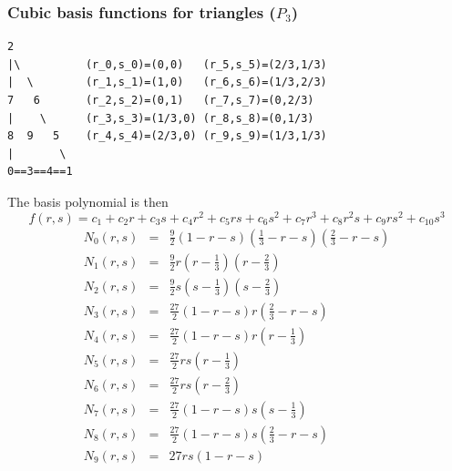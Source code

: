 









\subsubsection{Cubic basis functions for triangles ($P_3$)}

\begin{verbatim}
2
|\          (r_0,s_0)=(0,0)   (r_5,s_5)=(2/3,1/3)
|  \        (r_1,s_1)=(1,0)   (r_6,s_6)=(1/3,2/3)
7   6       (r_2,s_2)=(0,1)   (r_7,s_7)=(0,2/3)
|    \      (r_3,s_3)=(1/3,0) (r_8,s_8)=(0,1/3)
8  9   5    (r_4,s_4)=(2/3,0) (r_9,s_9)=(1/3,1/3)
|       \ 
0==3==4==1
\end{verbatim}
The basis polynomial is then
\[
f(r,s) = c_1 + c_2r + c_3s + c_4 r^2 + c_5 rs + c_6 s^2 + c_7 r^3 +c_8 r^2s + c_9 rs^2 + c_{10}s^3
\]
\begin{eqnarray}
N_0(r,s) &=& \frac{9}{2}(1-r-s)\left(\frac13-r-s\right)\left(\frac23-r-s\right) \\
N_1(r,s) &=& \frac{9}{2}r\left(r-\frac13\right)\left(r-\frac23 \right) \\
N_2(r,s) &=& \frac{9}{2}s\left(s-\frac13\right)\left(s-\frac23\right) \\
N_3(r,s) &=& \frac{27}{2}(1-r-s)r \left(\frac23-r-s\right) \\
N_4(r,s) &=& \frac{27}{2}(1-r-s)r\left(r-\frac13\right) \\
N_5(r,s) &=& \frac{27}{2}rs\left(r-\frac13\right) \\
N_6(r,s) &=& \frac{27}{2}rs\left(r-\frac23\right) \\
N_7(r,s) &=& \frac{27}{2}(1-r-s)s\left(s-\frac13\right) \\
N_8(r,s) &=& \frac{27}{2}(1-r-s)s \left(\frac23-r-s\right) \\
N_9(r,s) &=& 27 rs(1-r-s)
\end{eqnarray}



